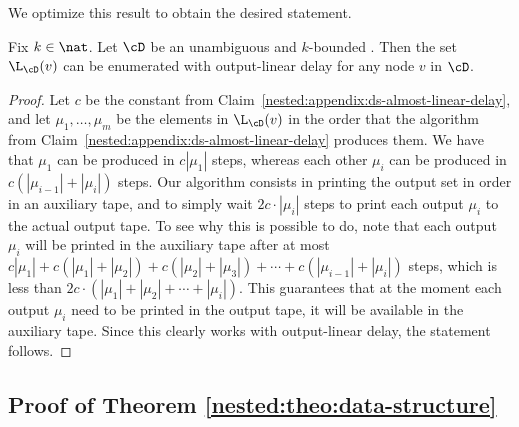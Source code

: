 We optimize this result to obtain the desired statement.

\begin{proposition}
	Fix $k\in\nat$. Let $\cD$ be an unambiguous and $k$-bounded \dsabbr. Then the set $\L_{\cD}(v)$ can be enumerated with output-linear delay for any node $v$ in $\cD$.
\end{proposition}
\begin{proof}
	Let $c$ be the constant from Claim~\ref{nested:appendix:ds-almost-linear-delay}, and let $\mu_1,\ldots,\mu_m$ be the elements in $\L_{\cD}(v)$ in the order that the algorithm from Claim~\ref{nested:appendix:ds-almost-linear-delay} produces them.  We have that $\mu_1$ can be produced in $c|\mu_1|$ steps, whereas each other $\mu_i$ can be produced in $c(|\mu_{i-1}|+|\mu_i|)$ steps. 
	Our algorithm consists in printing the output set in order in an auxiliary tape, and to simply wait $2c\cdot|\mu_i|$ steps to print each output $\mu_i$ to the actual output tape.
	To see why this is possible to do, note that each output $\mu_i$ will be printed in the auxiliary tape after at most $c|\mu_1| + c(|\mu_1|+|\mu_2|) + c(|\mu_2|+|\mu_3|) + \cdots + c(|\mu_{i-1}|+|\mu_i|)$ steps, which is less than $2c\cdot(|\mu_1|+|\mu_2|+\cdots+|\mu_i|)$. This guarantees that at the moment each output $\mu_i$ need to be printed in the output tape, it will be available in the auxiliary tape.
	Since this clearly works with output-linear delay, the statement follows.
\end{proof}


\subsection{Proof of Theorem \ref{nested:theo:data-structure}}

